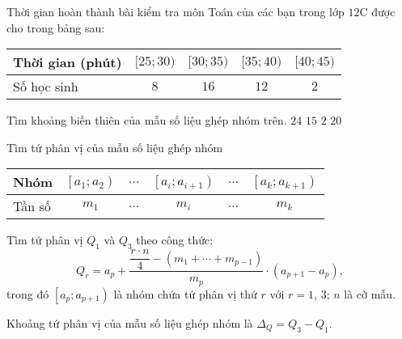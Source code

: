 \begin{ex}%
	Thời gian hoàn thành bài kiểm tra môn Toán của các bạn trong lớp $12$C được cho trong bảng sau:
	\begin{center}
		\begin{tabular}{|l|c|c|c|c|}
			\hline
			Thời gian (phút) & $[25;30 )$ & $[30;35)$ &$[35;40 )$ & $[40;45)$ \\
			\hline
			Số học sinh & $8$ & $16$ & $12$ & $2$ \\
			\hline
		\end{tabular}
	\end{center}
	Tìm khoảng biến thiên của mẫu số liệu ghép nhóm trên.
	\choice
	{$24$}
	{$15$}
	{$2$}
	{\True $20$}
\end{ex}

\begin{dang}{Tìm tứ phân vị của mẫu số liệu ghép nhóm}
	\begin{center}
		\begin{tabular}{|l|c|c|c|c|c|}
			\hline Nhóm &{$\left[a_1; a_2\right)$} & $\ldots$ &{$\left[a_i; a_{i+1}\right)$} & $\ldots$ &{$\left[a_k; a_{k+1}\right)$} \\
			\hline Tần số & $m_1$ & $\ldots$ & $m_i$ & $\ldots$ & $m_k$ \\
			\hline
		\end{tabular}
	\end{center}
	\begin{listEX}[1]
		\item [\ding{172}] Tìm tứ phân vị $ Q_1$ và $Q_3 $ theo công thức:
		$$Q_r=a_p+\dfrac{\dfrac{r \cdot n}{4}-\left(m_1+\cdots+m_{p-1}\right)}{m_p} \cdot\left(a_{p+1}-a_p\right), $$
		trong đó $\left[a_p; a_{p+1}\right)$ là nhóm chứa tứ phân vị thứ $r$ với $r=1$, $3$; \quad $n$ là cỡ mẫu.
		\item [\ding{173}] Khoảng tứ phân vị của mẫu số liệu ghép nhóm là $\Delta_Q=Q_3-Q_1$.
	\end{listEX}
\end{dang}

